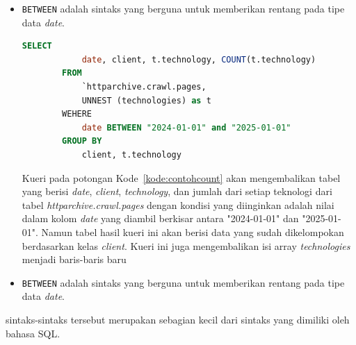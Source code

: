 \begin{itemize}
    \item \verb|BETWEEN| adalah sintaks yang berguna untuk memberikan rentang pada tipe data \textit{date}.
    \begin{lstlisting}[language=SQL, caption=contoh penggunaan sintaks \lstinline|BETWEEN|, label=kode:contohbetween]
        SELECT
            date, client, t.technology, COUNT(t.technology)
        FROM
            `httparchive.crawl.pages,
            UNNEST (technologies) as t
        WEHERE
            date BETWEEN "2024-01-01" and "2025-01-01"
        GROUP BY
            client, t.technology
    \end{lstlisting}
    Kueri pada potongan Kode~\ref{kode:contohcount} akan mengembalikan tabel yang berisi \textit{date}, \textit{client}, \textit{technology}, dan jumlah dari setiap teknologi dari tabel \textit{httparchive.crawl.pages} dengan kondisi yang diinginkan adalah nilai dalam kolom \textit{date} yang diambil berkisar antara "2024-01-01" dan "2025-01-01". Namun tabel hasil kueri ini akan berisi data yang sudah dikelompokan berdasarkan kelas \textit{client}. Kueri ini juga mengembalikan isi array \textit{technologies} menjadi baris-baris baru
    \item \verb|BETWEEN| adalah sintaks yang berguna untuk memberikan rentang pada tipe data \textit{date}.
\end{itemize}
sintaks-sintaks tersebut merupakan sebagian kecil dari sintaks yang dimiliki oleh bahasa SQL.




